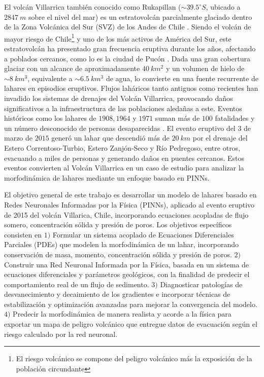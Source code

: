 El volcán Villarrica también conocido como Rukapillan ($\sim39.5^\circ S$, ubicado a $2847\ m$ sobre el nivel del mar) es un estratovolcán parcialmente glaciado dentro de la Zona Volcánica del Sur (SVZ) de los Andes de Chile \cite{https://doi.org/10.1029/2018GC007692}. Siendo el volcán de mayor 
riesgo de Chile\footnote{El riesgo volcánico se compone del peligro volcánico más la exposición de la población circundante} y uno de los más activos de América del Sur, este estratovolcán ha presentado gran frecuencia eruptiva durante los años, afectando
a poblados cercanos, como lo es la ciudad de Pucón \cite{romero2022pre,rivera2015recent}. Dada una gran cobertura glaciar con un alcance de aproximadamente $40\ km^2$ y un volumen de hielo de $\sim 8\ km^3$, equivalente a $\sim 6.5\ km^3$ de agua, 
lo convierte en una fuente recurrente de lahares en episodios eruptivos.
Flujos laháricos tanto antiguos como recientes han invadido los sistemas 
de drenajes del Volcán Villarrica, provocando daños significativos a la infraestructura de las poblaciones aledañas a este. Eventos históricos como los lahares de $1908,1964$ y $1971$ suman más de $100$ fatalidades 
y un número desconocido de personas desaparecidas \cite{lara2004villarrica}. El evento eruptivo del $3$ de marzo de $2015$ generó un lahar que descendió más de $20\ km$ por el drenaje del Estero Correntoso-Turbio, Estero Zanjón-Seco y Río Pedregoso, entre otros, 
evacuando a miles de personas y generando daños en puentes cercanos.
Estos eventos convierten al Volcán Villarrica en un caso de estudio para analizar la morfodinámica de lahares mediante un enfoque basado en PINNs.

El objetivo general de este trabajo es desarrollar un modelo de lahares basado en Redes Neuronales Informadas por la Física (PINNs), aplicado al evento eruptivo de 2015 del volcán Villarica, Chile, incorporando ecuaciones acopladas de flujo somero, concentración sólida y presión de poros. 
Los objetivos específicos consisten en $1)$ Formular un sistema acoplado de Ecuaciones Diferenciales Parciales (PDEs) que modelen la morfodinámica de un lahar, incorporando conservación de masa, momento, concentración sólida y presión de poros.
$2)$ Construir una Red Neuronal Informada por la Física, basada en un sistema de ecuaciones diferenciales y parámetros geológicos, con la finalidad de predecir el comportamiento real de un flujo de sedimento.
$3)$ Diagnosticar patologías de desvanecimiento y decaimiento de los gradientes e incorporar técnicas de estabilización y optimización avanzadas para mejorar la convergencia del modelo.
$4)$ Predecir la morfodinámica de manera realista y acorde a la física para exportar un mapa de peligro volcánico que entregue datos de evacuación según el riesgo calculado por la red neuronal.


